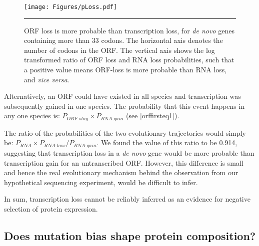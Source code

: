 \documentclass[12pt,a4paper]{article}
\begin{document}
\begin{figure}[!t]
\centering
\texttt{[image: Figures/pLoss.pdf]}
\caption{ORF loss is more probable than transcription loss, for \textit{de novo} genes containing more than 33 codons. The horizontal axis denotes the number of codons in the ORF. The vertical axis shows the log transformed ratio of ORF loss and RNA loss probabilities, such that a positive value means ORF-loss is more probable than RNA loss, and \textit{vice versa}.}
\label{lossprob}

\vspace{1ex}
\hrule
\end{figure}

Alternatively, an ORF could have existed in all species and transcription was subsequently gained in one species. The probability that this event happens in any one species is: $P_\textit{ORF-stay}\times P_\textit{RNA-gain}$ (see \autoref{orffirsteq1}). 

The ratio of the probabilities of the two evolutionary trajectories would simply be: $P_\textit{RNA} \times P_\textit{RNA-loss}/P_\textit{RNA-gain}$. We found the value of this ratio to be 0.914, suggesting that transcription loss in a \textit{de novo} gene would be more probable than transcription gain for an untranscribed ORF. However, this difference is small and hence the real evolutionary mechanism behind the observation from our hypothetical sequencing experiment, would be difficult to infer. 

In sum, transcription loss cannot be reliably inferred as an evidence for negative selection of protein expression.

\subsection{Does mutation bias shape protein composition?}
\end{document}
